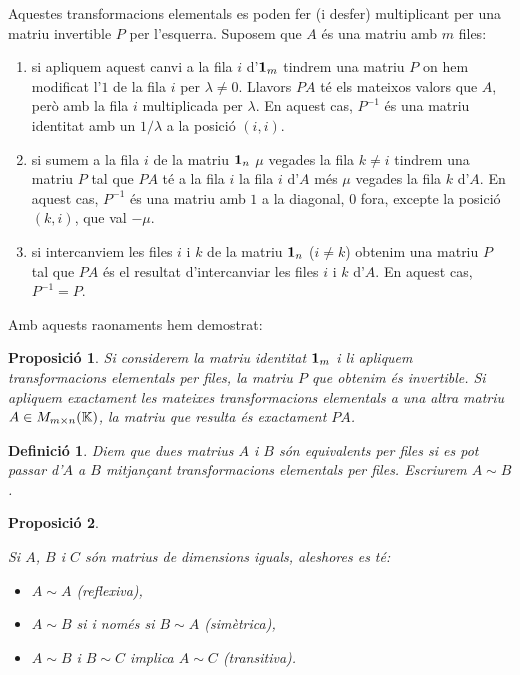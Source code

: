 \documentclass[
  11pt,
]{book}
\numberwithin{dummy}{section}
\theoremstyle{maincolornumbox}
\theoremstyle{blacknumex}
\theoremstyle{blacknumbox}
\newtheorem{definitionT}{Definició}[chapter]
\theoremstyle{maincolornum}
\newtheorem{propositionT}{Proposició}[chapter]
\newenvironment{proposition}{\begin{pBox}\begin{propositionT}}{\end{propositionT}\end{pBox}}
\newenvironment{definition}{\begin{dBox}\begin{definitionT}}{\end{definitionT}\end{dBox}}
\begin{document}
Aquestes transformacions elementals es poden fer (i desfer) multiplicant
per una matriu invertible \(P\) per l'esquerra. Suposem que \(A\) és una
matriu amb \(m\) files:

\begin{enumerate}
\def\labelenumi{\arabic{enumi}.}
\item
  si apliquem aquest canvi a la fila \(i\) d'\(\mathbf{1}_m\) tindrem una matriu
  \(P\) on hem modificat l'\(1\) de la fila \(i\) per \(\lambda\neq 0\).
  Llavors \(PA\) té els mateixos valors que \(A\), però amb la fila \(i\)
  multiplicada per \(\lambda\). En aquest cas, \(P^{-1}\) és una matriu
  identitat amb un \(1/\lambda\) a la posició \((i,i)\).
\item
  si sumem a la fila \(i\) de la matriu \(\mathbf{1}_n\) \(\mu\) vegades la fila
  \(k\neq i\) tindrem una matriu \(P\) tal que \(PA\) té a la fila \(i\) la
  fila \(i\) d'\(A\) més \(\mu\) vegades la fila \(k\) d'\(A\). En aquest cas,
  \(P^{-1}\) és una matriu amb \(1\) a la diagonal, \(0\) fora, excepte la
  posició \((k,i)\), que val \(-\mu\).
\item
  si intercanviem les files \(i\) i \(k\) de la matriu \(\mathbf{1}_n\) (\(i\neq k\))
  obtenim una matriu \(P\) tal que \(PA\) és el resultat d'intercanviar
  les files \(i\) i \(k\) d'\(A\). En aquest cas, \(P^{-1}=P\).
\end{enumerate}

Amb aquests raonaments hem demostrat:

\begin{proposition}
Si considerem la matriu identitat \(\mathbf{1}_m\) i li apliquem transformacions
elementals per files, la matriu \(P\) que obtenim és invertible. Si
apliquem exactament les mateixes transformacions elementals a una altra
matriu \(A\in M_{m\times n}(\mathbb{K})\), la matriu que resulta és exactament
\(PA\).
\end{proposition}

\begin{definition}
Diem que \emph{dues matrius \(A\) i \(B\) són equivalents per files} si es pot
passar d'\(A\) a \(B\) mitjançant transformacions elementals per files.
Escriurem \(A \sim B\).
\end{definition}

\begin{proposition}
\protect\hypertarget{prp:relequiv}{}\label{prp:relequiv}

Si \(A\), \(B\) i \(C\) són matrius
de dimensions iguals, aleshores es té:

\begin{itemize}
\item
  \(A \sim A\) (reflexiva),
\item
  \(A \sim B\) si i només si \(B \sim A\) (simètrica),
\item
  \(A \sim B\) i \(B \sim C\) implica \(A \sim C\) (transitiva).
\end{itemize}

\end{proposition}
\end{document}
